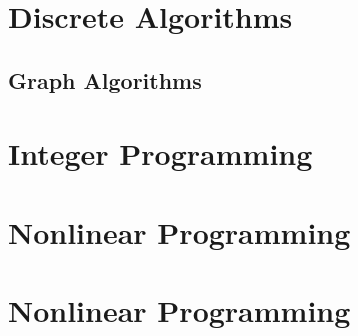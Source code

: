 \documentclass[letter,12pt]{book}
\renewcommand{\0}{\mathbf{0}}
\begin{document}
\part{Discrete Algorithms}

\chapter{Graph Algorithms}



\part{Integer Programming}
\label{part:IntegerProgramming}
















\part{Nonlinear Programming}


%



\part{Nonlinear Programming}
\end{document}
